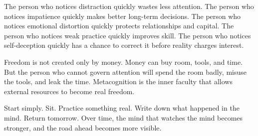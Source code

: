 The person who notices distraction quickly wastes less attention. The person who notices impatience quickly makes better long-term decisions. The person who notices emotional distortion quickly protects relationships and capital. The person who notices weak practice quickly improves skill. The person who notices self-deception quickly has a chance to correct it before reality charges interest.

Freedom is not created only by money. Money can buy room, tools, and time. But the person who cannot govern attention will spend the room badly, misuse the tools, and leak the time. Metacognition is the inner faculty that allows external resources to become real freedom.

Start simply. Sit. Practice something real. Write down what happened in the mind. Return tomorrow. Over time, the mind that watches the mind becomes stronger, and the road ahead becomes more visible.
